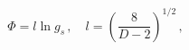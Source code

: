 \begin{equation}
\label{couplingD}
\Phi=l \ln g_s\, ,\quad l=\left(\frac{8}{D-2}\right)^{1/2}\, ,
\end{equation} 
